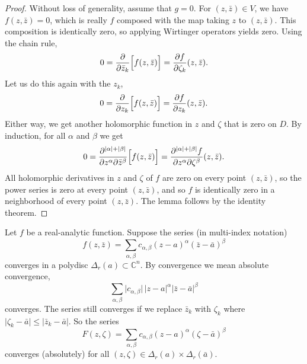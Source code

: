\documentclass[12pt,openany]{book}
\newcommand{\sabs}[1]{\lvert {#1} \rvert}
\newcommand{\C}{{\mathbb{C}}}
\theoremstyle{plain}
\theoremstyle{remark}
\theoremstyle{definition}
\theoremstyle{exercise}
\theoremstyle{example}
\begin{document}
\begin{proof}
Without loss of generality, assume that $g=0$.
For $(z,\bar{z}) \in V$, we have $f(z,\bar{z}) = 0$, which is really
$f$ composed with the map taking $z$ to $(z,\bar{z})$.  This
composition is identically zero, so applying Wirtinger operators yields zero.
Using the chain rule,
\begin{equation*}
0 =
\frac{\partial}{\partial \bar{z}_k} \Bigl[f(z,\bar{z})\Bigr]
=
\frac{\partial f}{\partial \zeta_k}(z,\bar{z}) .
\end{equation*}
Let us do this again with the $z_k$,
\begin{equation*}
0 =
\frac{\partial}{\partial z_k} \Bigl[f(z,\bar{z})\Bigr]
=
\frac{\partial f}{\partial z_k}(z,\bar{z}) .
\end{equation*}
Either way, we get another holomorphic function in $z$ and $\zeta$
that is zero on $D$.
By induction, for all $\alpha$ and $\beta$ we get
\begin{equation*}
0 =
\frac{\partial^{\sabs{\alpha}+\sabs{\beta}}}{\partial z^\alpha \partial \bar{z}^\beta} \Bigl[f(z,\bar{z})\Bigr]
=
\frac{\partial^{\sabs{\alpha}+\sabs{\beta}} f}{\partial z^\alpha \partial
\zeta^\beta}(z,\bar{z}) .
\end{equation*}
All holomorphic derivatives in $z$ and $\zeta$ of $f$ are zero on every point
$(z,\bar{z})$, so the power series is zero at every point $(z,\bar{z})$,
and so $f$ is identically zero in a neighborhood of every
point $(z,\bar{z})$.  The lemma follows by the identity
theorem.
\end{proof}

Let $f$ be a real-analytic function.  Suppose
the series (in multi-index notation)
\begin{equation*}
f(z,\bar{z}) =
\sum_{\alpha,\beta} c_{\alpha,\beta} {(z-a)}^\alpha
{(\bar{z}-\bar{a})}^\beta
\end{equation*}
converges in a polydisc $\Delta_r(a) \subset \C^n$.
By convergence we mean absolute
convergence,
\begin{equation*}
\sum_{\alpha,\beta} \sabs{c_{\alpha,\beta}} \, \sabs{z-a}^\alpha
\sabs{\bar{z}-\bar{a}}^\beta
\end{equation*}
converges.
The series still converges if we replace $\bar{z}_k$  with
$\zeta_k$ where $\sabs{\zeta_k-\bar{a}} \leq \sabs{\bar{z}_k-\bar{a}}$.
So the series
\begin{equation*}
F(z,\zeta) =
\sum_{\alpha,\beta} c_{\alpha,\beta} {(z-a)}^\alpha
{(\zeta-\bar{a})}^\beta
\end{equation*}
converges (absolutely) for all $(z,\zeta) \in \Delta_r(a) \times \Delta_r(\bar{a})$.
\end{document}
